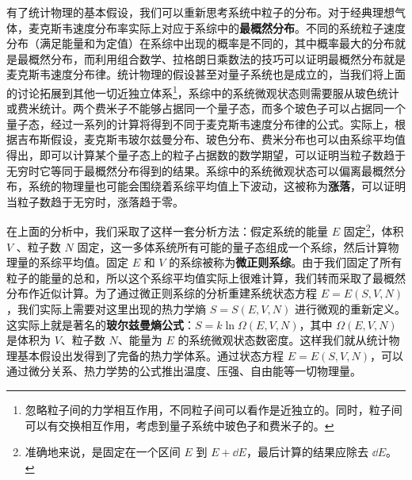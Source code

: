有了统计物理的基本假设，我们可以重新思考系统中粒子的分布。对于经典理想气体，麦克斯韦速度分布率实际上对应于系综中的\textbf{最概然分布}。不同的系统粒子速度分布（满足能量和为定值）在系综中出现的概率是不同的，其中概率最大的分布就是最概然分布，而利用组合数学、拉格朗日乘数法的技巧可以证明最概然分布就是麦克斯韦速度分布律。统计物理的假设甚至对量子系统也是成立的，当我们将上面的讨论拓展到其他一切近独立体系\footnote{忽略粒子间的力学相互作用，不同粒子间可以看作是近独立的。同时，粒子间可以有交换相互作用，考虑到量子系统中玻色子和费米子的。}，系综中的系统微观状态则需要服从玻色统计或费米统计。两个费米子不能够占据同一个量子态，而多个玻色子可以占据同一个量子态，经过一系列的计算将得到不同于麦克斯韦速度分布律的公式。实际上，根据吉布斯假设，麦克斯韦玻尔兹曼分布、玻色分布、费米分布也可以由系综平均值得出，即可以计算某个量子态上的粒子占据数的数学期望，可以证明当粒子数趋于无穷时它等同于最概然分布得到的结果。系综中的系统微观状态可以偏离最概然分布，系统的物理量也可能会围绕着系综平均值上下波动，这被称为\textbf{涨落}，可以证明当粒子数趋于无穷时，涨落趋于零。

在上面的分析中，我们采取了这样一套分析方法：假定系统的能量 $E$ 固定\footnote{准确地来说，是固定在一个区间 $E$ 到 $E+\dd E$，最后计算的结果应除去 $\dd E$。}，体积 $V$ 、粒子数 $N$ 固定，这一多体系统所有可能的量子态组成一个系综，然后计算物理量的系综平均值。固定 $E$ 和 $V$ 的系综被称为\textbf{微正则系综}。由于我们固定了所有粒子的能量的总和，所以这个系综平均值实际上很难计算，我们转而采取了最概然分布作近似计算。为了通过微正则系综的分析重建系统状态方程 $E=E(S,V,N)$，我们实际上需要对这里出现的热力学熵 $S=S(E,V,N)$ 进行微观的重新定义。这实际上就是著名的\textbf{玻尔兹曼熵公式}：$S=k\ln \Omega(E,V,N)$，其中 $\Omega(E,V,N)$ 是体积为 $V$、粒子数 $N$、能量为 $E$ 的系统微观状态数密度。这样我们就从统计物理基本假设出发得到了完备的热力学体系。通过状态方程 $E=E(S,V,N)$，可以通过微分关系、热力学势的公式推出温度、压强、自由能等一切物理量。

